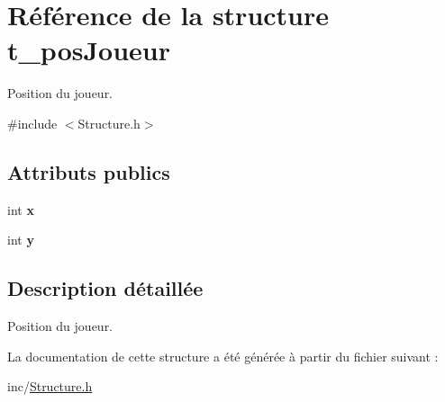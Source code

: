 \hypertarget{structt__posJoueur}{}\section{Référence de la structure t\+\_\+pos\+Joueur}
\label{structt__posJoueur}


Position du joueur.  




{\ttfamily \#include $<$Structure.\+h$>$}

\subsection*{Attributs publics}
\begin{DoxyCompactItemize}
\item 
\hypertarget{structt__posJoueur_a59ad716082f515bbd7fd19952c433904}{}int {\bfseries x}\label{structt__posJoueur_a59ad716082f515bbd7fd19952c433904}

\item 
\hypertarget{structt__posJoueur_afa0d1d2dfb002c1992c4a33938988034}{}int {\bfseries y}\label{structt__posJoueur_afa0d1d2dfb002c1992c4a33938988034}

\end{DoxyCompactItemize}


\subsection{Description détaillée}
Position du joueur. 

La documentation de cette structure a été générée à partir du fichier suivant \+:\begin{DoxyCompactItemize}
\item 
inc/\hyperlink{Structure_8h}{Structure.\+h}\end{DoxyCompactItemize}
